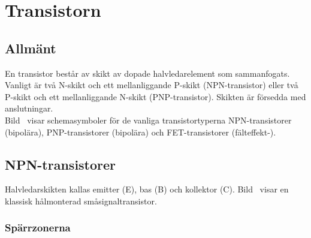 \newpage
\section{Transistorn}
\label{sec:transistorn}


\subsection{Allmänt}
\label{transistor_allmänt}

En transistor består av skikt av dopade halvledarelement som sammanfogats.
Vanligt är två N-skikt och ett mellanliggande P-skikt (NPN-transistor) eller två
P-skikt och ett mellanliggande N-skikt (PNP-transistor).
Skikten är försedda med anslutningar.\\

Bild~ visar schemasymboler för de vanliga tran\-sistor\-typerna 
NPN-transistorer (bipolära), PNP-\-tran\-sistorer (bipolära) och
FET-transistorer (fälteffekt-).

\subsection{NPN-transistorer}

Halvledarskikten kallas emitter (E), bas (B) och kollektor (C).
Bild~ visar en klassisk hålmonterad småsignaltransistor.



\subsubsection{Spärrzonerna}

